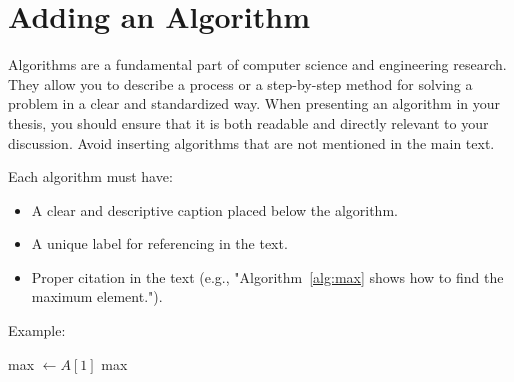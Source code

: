 \documentclass[12pt]{report}
\begin{document}
\section{Adding an Algorithm}


Algorithms are a fundamental part of computer science and engineering research. They allow you to describe a process or a step-by-step method for solving a problem in a clear and standardized way. When presenting an algorithm in your thesis, you should ensure that it is both readable and directly relevant to your discussion. Avoid inserting algorithms that are not mentioned in the main text.

Each algorithm must have:
\begin{itemize}
  \item A clear and descriptive caption placed below the algorithm.
  \item A unique label for referencing in the text.
  \item Proper citation in the text (e.g., "Algorithm~\ref{alg:max} shows how to find the maximum element.").
\end{itemize}

Example:


\begin{algorithm}[H]
\SetAlgoLined
{}
max $\leftarrow A[1]$\;
\Return max\;
\caption{Finding the maximum element in an array}
\label{alg:max}
\end{algorithm}








	




\end{document}
